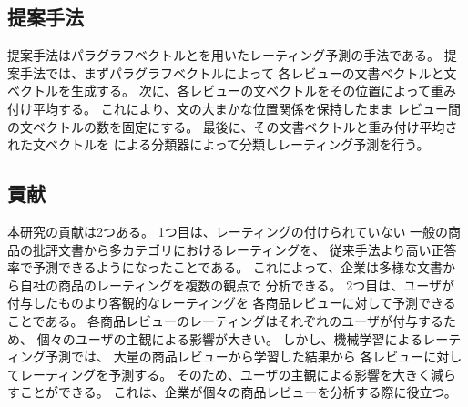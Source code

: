 \subsection{提案手法}

提案手法はパラグラフベクトルと\nn を用いたレーティング予測の手法である。
提案手法では、まずパラグラフベクトル\cite{quoc14}によって
各レビューの文書ベクトルと文ベクトルを生成する。
次に、各レビューの文ベクトルをその位置によって重み付け平均する。
これにより、文の大まかな位置関係を保持したまま
レビュー間の文ベクトルの数を固定にする。
最後に、その文書ベクトルと重み付け平均された文ベクトルを
\nn による分類器によって分類しレーティング予測を行う。


\subsection{貢献}

本研究の貢献は2つある。
1つ目は、レーティングの付けられていない
一般の商品の批評文書から多カテゴリにおけるレーティングを、
従来手法より高い正答率で予測できるようになったことである。
これによって、企業は多様な文書から自社の商品のレーティングを複数の観点で
分析できる。
2つ目は、ユーザが付与したものより客観的なレーティングを
各商品レビューに対して予測できることである。
各商品レビューのレーティングはそれぞれのユーザが付与するため、
個々のユーザの主観による影響が大きい。
しかし、機械学習によるレーティング予測では、
大量の商品レビューから学習した結果から
各レビューに対してレーティングを予測する。
そのため、ユーザの主観による影響を大きく減らすことができる。
これは、企業が個々の商品レビューを分析する際に役立つ。


%
